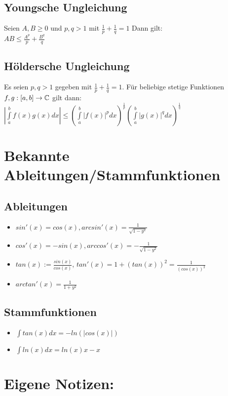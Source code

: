 \documentclass[german]{latex4ei/latex4ei_sheet}
\begin{document}
\begin{sectionbox}
	\subsection{Youngsche Ungleichung}
	 Seien $A, B \ge 0 $ und $p, q > 1$ mit $ \frac{1}{p}+\frac{1}{q}=1$
  Dann gilt:\\
	 $AB \le \frac{A^p}{p}+\frac{B^q}{q}$

\end{sectionbox}

\begin{sectionbox}
	\subsection{Höldersche Ungleichung}
	Es seien $p, q > 1$ gegeben mit $ \frac{1}{p}+\frac{1}{q}=1$.
  Für beliebige stetige Funktionen $f, g : [a, b] \rightarrow \mathbb C$ gilt dann:\\
	$|\int \limits_{a}^{b} f(x)g(x)dx| \le (\int \limits_{a}^{b} |f(x)|^pdx)^{\frac{1}{p}} (\int \limits_{a}^{b} |g(x)|^qdx)^{\frac{1}{q}}$

\end{sectionbox}

\section{Bekannte Ableitungen/Stammfunktionen}
	\begin{sectionbox}
		\subsection{Ableitungen}
		\begin{itemize}
			\item $sin'(x)=cos(x), arcsin'(x)=\frac{1}{\sqrt{1-y^2}}$
			\item  $cos'(x)=-sin(x), arccos'(x)=-\frac{1}{\sqrt{1-y^2}}$

			\item $tan(x):=\frac{sin(x)}{cos(x)}$, $tan'(x)=1+(tan(x))^2=\frac{1}{(cos(x))^2}$
			\item $arctan'(x)=\frac{1}{1+y^2}$
		\end{itemize}
		\subsection{Stammfunktionen}
		\begin{itemize}
			\item $\int tan(x)dx=-ln(|cos(x)|)$
			\item $\int ln(x)dx=ln(x)x-x$
		\end{itemize}
	\end{sectionbox}

\section{Eigene Notizen:}




\end{document}
